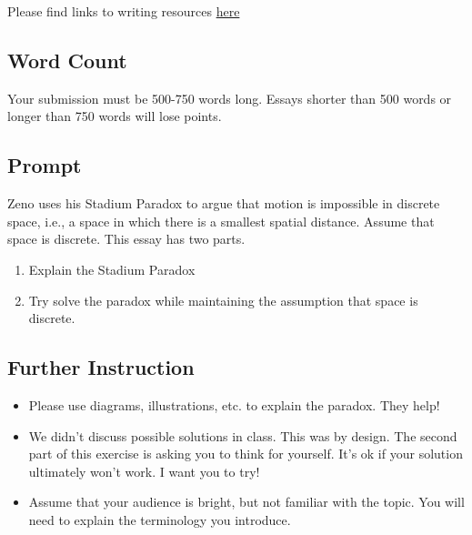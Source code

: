 \documentclass[]{article}
\begin{document}
Please find links to writing resources \href{/Teaching/Resources/}{here}

\subsection{Word Count}\label{word-count}

Your submission must be 500-750 words long. Essays shorter than 500
words or longer than 750 words will lose points.

\subsection{Prompt}\label{prompt}

Zeno uses his Stadium Paradox to argue that motion is impossible in
discrete space, i.e., a space in which there is a smallest spatial
distance. Assume that space is discrete. This essay has two parts.

\begin{enumerate}
\def\labelenumi{\arabic{enumi}.}
\itemsep1pt\parskip0pt
\item
  Explain the Stadium Paradox\\
\item
  Try solve the paradox while maintaining the assumption that space is
  discrete.
\end{enumerate}

\subsection{Further Instruction}\label{further-instruction}

\begin{itemize}
\itemsep1pt\parskip0pt
\item
  Please use diagrams, illustrations, etc. to explain the paradox. They
  help!
\item
  We didn't discuss possible solutions in class. This was by design. The
  second part of this exercise is asking you to think for yourself. It's
  ok if your solution ultimately won't work. I want you to try!
\item
  Assume that your audience is bright, but not familiar with the topic.
  You will need to explain the terminology you introduce.
\end{itemize}
\end{document}

